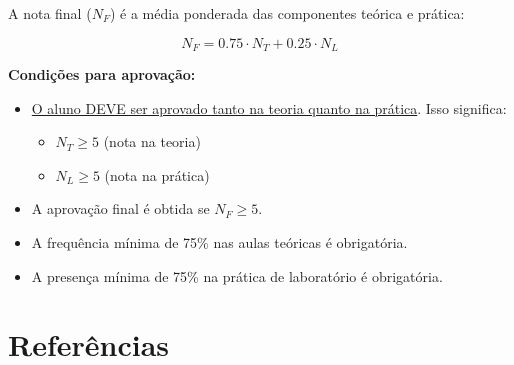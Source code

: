 \documentclass[11pt,a4paper]{article}
\begin{document}
A nota final ($N_F$) é a média ponderada das componentes teórica e prática:

\[
N_F = 0.75 \cdot N_T + 0.25 \cdot N_L
\]

\textbf{Condições para aprovação:}
\begin{itemize}[noitemsep]
  \item \underline{O aluno DEVE ser aprovado tanto na teoria quanto na prática}. Isso significa:
    \begin{itemize}[noitemsep, leftmargin=1cm]
      \item $N_T \geq 5$ (nota na teoria)
      \item $N_L \geq 5$ (nota na prática)
    \end{itemize}
  \item A aprovação final é obtida se $N_F \geq 5$.
  \item A frequência mínima de 75\% nas aulas teóricas é obrigatória.
  \item A presença mínima de 75\% na prática de laboratório é obrigatória.
\end{itemize}



\section{Referências}

\nocite{*}
\printbibliography[heading=none]
\end{document}
